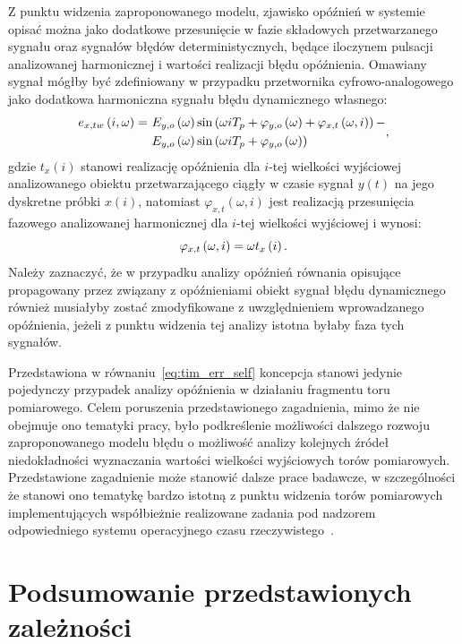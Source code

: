 Z punktu widzenia zaproponowanego modelu, zjawisko opóźnień w systemie opisać można jako dodatkowe przesunięcie w fazie składowych przetwarzanego sygnału oraz sygnałów błędów deterministycznych, będące iloczynem pulsacji analizowanej harmonicznej i wartości realizacji błędu opóźnienia. Omawiany sygnał mógłby być zdefiniowany w przypadku przetwornika cyfrowo-analogowego jako dodatkowa harmoniczna sygnału błędu dynamicznego własnego:
\begin{equation}
\begin{split}
e_{x,tw} \left(i,\omega\right) =~
& E_{y,o} \left(\omega\right) \sin \left( \omega i T_{p} + \varphi_{y,o} \left(\omega\right) + \varphi_{x,t} \left(\omega, i\right) \right) - \\
& E_{y,o} \left(\omega\right) \sin \left( \omega i T_{p} + \varphi_{y,o} \left(\omega\right) \right)
\end{split}
\label{eq:tim_err_self},
\end{equation}
gdzie $t_{x}(i)$ stanowi realizację opóźnienia dla $i$-tej wielkości wyjściowej analizowanego obiektu przetwarzającego ciągły w czasie sygnał $y(t)$ na jego dyskretne próbki $x(i)$, natomiast $\varphi_{x,t}(\omega, i)$ jest realizacją przesunięcia fazowego analizowanej harmonicznej dla $i$-tej wielkości wyjściowej i wynosi:
\begin{equation}
\varphi_{x,t} \left(\omega, i\right) = \omega t_{x} \left(i\right) \label{eq:tim_err_phi}.
\end{equation}
Należy zaznaczyć, że w przypadku analizy opóźnień równania opisujące propagowany przez związany z opóźnieniami obiekt sygnał błędu dynamicznego również musiałyby zostać zmodyfikowane z uwzględnieniem wprowadzanego opóźnienia, jeżeli z punktu widzenia tej analizy istotna byłaby faza tych sygnałów.

Przedstawiona w równaniu~\eqref{eq:tim_err_self} koncepcja stanowi jedynie pojedynczy przypadek analizy opóźnienia w działaniu fragmentu toru pomiarowego. Celem poruszenia przedstawionego zagadnienia, mimo że nie obejmuje ono tematyki pracy, było podkreślenie możliwości dalszego rozwoju zaproponowanego modelu błędu o możliwość analizy kolejnych źródeł niedokładności wyznaczania wartości wielkości wyjściowych torów pomiarowych. Przedstawione zagadnienie może stanowić dalsze prace badawcze, w szczególności że stanowi ono tematykę bardzo istotną z punktu widzenia torów pomiarowych implementujących współbieżnie realizowane zadania pod nadzorem odpowiedniego systemu operacyjnego czasu rzeczywistego~\cite{bandyszak_rtos, laplante_rtos}.

\section{Podsumowanie przedstawionych zależności}

